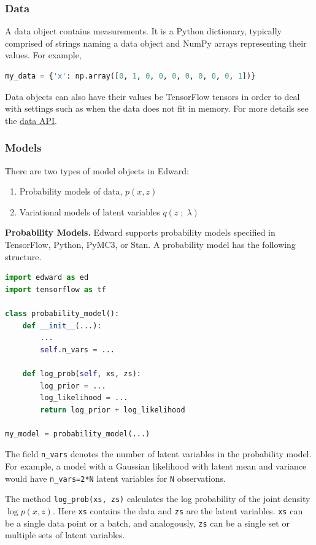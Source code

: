 \subsubsection{Data}

A data object contains measurements. It is a Python dictionary,
typically comprised of strings naming a data object and NumPy arrays
representing their values. For example,

\begin{lstlisting}[language=Python]
my_data = {'x': np.array([0, 1, 0, 0, 0, 0, 0, 0, 0, 1])}
\end{lstlisting}

Data objects can also have their values be TensorFlow tensors in order
to deal with settings such as when the data does not fit in memory.
For more details see the \href{#}{data API}.

\subsubsection{Models}\label{models}

There are two types of model objects in Edward:
\begin{enumerate}
\item Probability models of data, $p(x,z)$
\item Variational models of latent variables $q(z\;;\;\lambda)$
\end{enumerate}

\textbf{Probability Models.}
Edward supports probability models specified in TensorFlow, Python, PyMC3,
or Stan. A probability model has the following structure.
\begin{lstlisting}[language=Python]
import edward as ed
import tensorflow as tf

class probability_model():
    def __init__(...):
        ...
        self.n_vars = ...

    def log_prob(self, xs, zs):
        log_prior = ...
        log_likelihood = ...
        return log_prior + log_likelihood

my_model = probability_model(...)
\end{lstlisting}
The field \texttt{n\_vars} denotes the number of latent variables in the
probability model. For example, a model with a Gaussian likelihood with latent
mean and variance would have \texttt{n\_vars=2*N} latent variables for
\texttt{N} observations.

The method \texttt{log_prob(xs, zs)} calculates the log probability of
the joint density $\log p(x,z)$. Here \texttt{xs} contains the data
and \texttt{zs} are the latent variables. \texttt{xs} can be a single
data point or a batch, and analogously, \texttt{zs} can be a single set or
multiple sets of latent variables.

